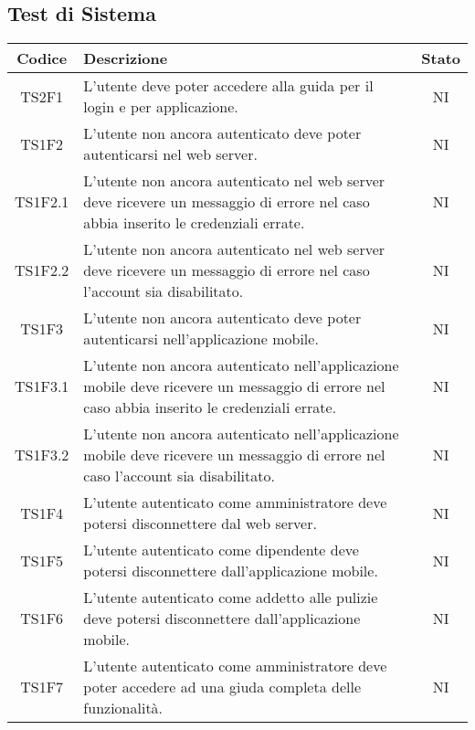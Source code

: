	\subsection{Test di Sistema}
	\begin{center}
		\begin{longtable}{|c|p{10cm}|c|}
			\hline
			\rowcolor{lighter-grayer}
			\textbf{Codice} & \textbf{Descrizione} & \textbf{Stato}  \\ 
						
			\hline
			\endhead
			
			\hline
			TS2F1 & L'utente deve poter accedere alla guida per il login e per applicazione. & NI \\
			\hline
			TS1F2 & L'utente non ancora autenticato deve poter autenticarsi nel web server. & NI \\			
			\hline
			TS1F2.1 & L'utente non ancora autenticato nel web server deve ricevere un messaggio di errore nel caso abbia inserito le credenziali errate. & NI \\			
			\hline
			TS1F2.2 & L'utente non ancora autenticato nel web server deve ricevere un messaggio di errore nel caso l'account sia disabilitato. & NI \\			
			\hline
			TS1F3 & L'utente non ancora autenticato deve poter autenticarsi nell'applicazione mobile. & NI \\			
			\hline
			TS1F3.1 & L'utente non ancora autenticato nell'applicazione mobile deve ricevere un messaggio di errore nel caso abbia inserito le credenziali errate. & NI \\			
			\hline
			TS1F3.2 & L'utente non ancora autenticato nell'applicazione mobile deve ricevere un messaggio di errore nel caso l'account sia disabilitato. & NI \\			
			\hline
			TS1F4 & L'utente autenticato come amministratore deve potersi disconnettere dal web server. & NI \\			
			\hline
			TS1F5 & L'utente autenticato come dipendente deve potersi disconnettere dall'applicazione mobile. & NI \\			
			\hline			
			TS1F6 & L'utente autenticato come addetto alle pulizie deve potersi disconnettere dall'applicazione mobile. & NI \\			
			\hline
			TS1F7 & L'utente autenticato come amministratore deve poter accedere ad una giuda completa delle funzionalità. & NI \\		
			\hline

\end{longtable}
\end{center}
